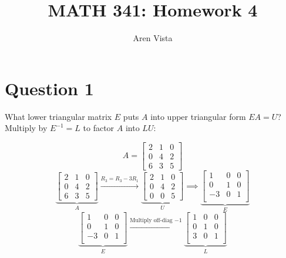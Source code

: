 \documentclass[9pt]{article}
\title{ MATH 341: Homework 4}
\author{ Aren Vista }
\theoremstyle{plain}
\begin{document}
\maketitle
\section{Question 1}
\begin{center}
	What lower triangular matrix $E$ puts $A$ into upper triangular form $EA=U$? \\
	Multiply by $E^{-1}=L$ to factor $A$ into $LU$:
\end{center}
\[
	A =
	\begin{bmatrix}
		2 & 1 & 0 \\
		0 & 4 & 2 \\
		6 & 3 & 5
	\end{bmatrix}
\]
\[
	\underbrace{\begin{bmatrix}
			2 & 1 & 0 \\
			0 & 4 & 2 \\
			6 & 3 & 5
		\end{bmatrix}}_{A}
	\xrightarrow{R_3 = R_3 - 3R_1}
	\underbrace{\begin{bmatrix}
			2 & 1 & 0 \\
			0 & 4 & 2 \\
			0 & 0 & 5
		\end{bmatrix}}_{U}
	\implies
	\underbrace{\begin{bmatrix}
			1  & 0 & 0 \\
			0  & 1 & 0 \\
			-3 & 0 & 1 \\
		\end{bmatrix}}_{E}
\]
\[
	\underbrace{\begin{bmatrix}
			1  & 0 & 0 \\
			0  & 1 & 0 \\
			-3 & 0 & 1 \\
		\end{bmatrix}}_{E}
	\xrightarrow{\text{Multiply off-diag $-1$}}
	\underbrace{\begin{bmatrix}
			1 & 0 & 0 \\
			0 & 1 & 0 \\
			3 & 0 & 1 \\
		\end{bmatrix}}_{L}
\]
\end{document}
